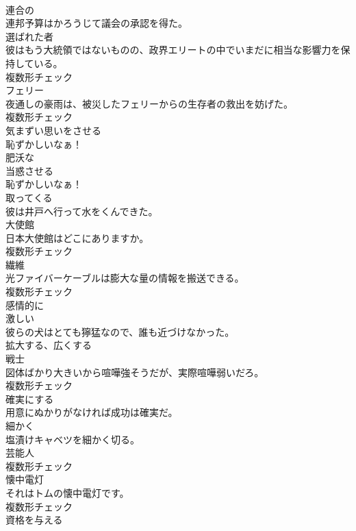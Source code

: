 \documentclass[8pt]{extreport}
\begin{document}
\begin{CJK}{UTF8}{min}
\\	[形容詞]	連合の	
\\	連邦予算はかろうじて議会の承認を得た。	
\\	[名詞]	選ばれた者	
\\	彼はもう大統領ではないものの、政界エリートの中でいまだに相当な影響力を保持している。	
\\	複数形チェック
\\	[名詞]	フェリー	
\\	夜通しの豪雨は、被災したフェリーからの生存者の救出を妨げた。	
\\	複数形チェック
\\	[動詞]	気まずい思いをさせる	
\\	恥ずかしいなぁ！	
\\	[形容詞]	肥沃な	
\\	[形容詞]	当惑させる	
\\	恥ずかしいなぁ！	
\\	[動詞]	取ってくる	
\\	彼は井戸へ行って水をくんできた。	
\\	[名詞]	大使館	
\\	日本大使館はどこにありますか。	
\\	複数形チェック
\\	[名詞]	繊維	
\\	光ファイバーケーブルは膨大な量の情報を搬送できる。	
\\	複数形チェック
\\	[副詞]	感情的に	
\\	[形容詞]	激しい	
\\	彼らの犬はとても獰猛なので、誰も近づけなかった。	
\\	[動詞]	拡大する、広くする	
\\	[名詞]	戦士	
\\	図体ばかり大きいから喧嘩強そうだが、実際喧嘩弱いだろ。	
\\	複数形チェック
\\	[動詞]	確実にする	
\\	用意にぬかりがなければ成功は確実だ。	
\\	[副詞]	細かく	
\\	塩漬けキャベツを細かく切る。	
\\	[名詞]	芸能人	
\\	複数形チェック
\\	[名詞]	懐中電灯	
\\	それはトムの懐中電灯です。	
\\	複数形チェック
\\	[動詞]	資格を与える	

\end{CJK}
\end{document}
